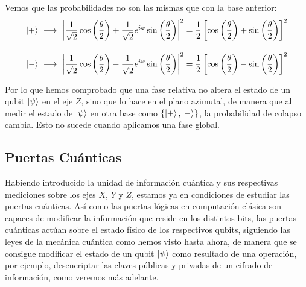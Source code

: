 \documentclass[12pt]{article}
\numberwithin{equation}{section} %
\begin{document}
    \vspace{2.5mm}

    Vemos que las probabilidades no son las mismas que con la base anterior:
    \begin{align*}
        \ket{+} \ &\longrightarrow \ \left| \frac{1}{\sqrt{2}} \cos \left( \frac{\theta}{2} \right) + \frac{1}{\sqrt{2}} e^{i \varphi} \sin \left( \frac{\theta}{2} \right) \right| ^ {2} = \frac{1}{2} \left[ \cos \left( \frac{\theta}{2} \right) + \sin \left( \frac{\theta}{2} \right)\right] ^ {2} \\[10pt]
        \ket{-} \ &\longrightarrow \ \left| \frac{1}{\sqrt{2}} \cos \left( \frac{\theta}{2} \right) - \frac{1}{\sqrt{2}} e^{i \varphi} \sin \left( \frac{\theta}{2} \right) \right| ^ {2} = \frac{1}{2} \left[ \cos \left( \frac{\theta}{2} \right) - \sin \left( \frac{\theta}{2} \right)\right] ^ {2}
    \end{align*}

    \vspace{5mm}

    Por lo que hemos comprobado que una fase relativa no altera el estado de un qubit \( \ket{\psi} \) en el eje \( Z \), sino que lo hace en el plano azimutal, de manera que al medir el estado de \( \ket{\psi} \) en otra base como \( \{ \ket{+}, \ket{-} \} \), la probabilidad de colapso cambia. Esto no sucede cuando aplicamos una fase global.

    \vspace{10mm}


    


    \subsection{Puertas Cuánticas}\label{sec: puertas_cuanticas}

    \vspace{5mm}

    Habiendo introducido la unidad de información cuántica y sus respectivas mediciones sobre los ejes \( X \), \( Y \) y \( Z \), estamos ya en condiciones de estudiar las puertas cuánticas. Así como las puertas lógicas en computación clásica son capaces de modificar la información que reside en los distintos bits, las puertas cuánticas actúan sobre el estado físico de los respectivos qubits, siguiendo las leyes de la mecánica cuántica como hemos visto hasta ahora, de manera que se consigue modificar el estado de un qubit \( \ket{\psi} \) como resultado de una operación, por ejemplo, desencriptar las claves públicas y privadas de un cifrado de información, como veremos más adelante.
    
\end{document}
